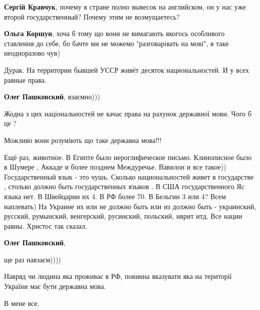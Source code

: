 \begin{itemize}
\begin{itemize}
\textbf{Сергій Кравчук}, почему в стране полно вывесок на английском, он у нас уже второй государственный? Почему этим не возмущаетесь?

\textbf{Ольга Коршун}, хоча б тому що вони не вимагають якогось особливого ставлення до себе, бо бачте ми не можемо "разговарівать на мові", я таке неодноразово чув)

Дурак. На территории бывшей УССР живёт десяток национальностей. И у всех равные
права.


\textbf{Олег Пашковский}, взаємно)))

Жодна з цих національностей не качає права на рахунок державної мови. Чого б це
?

Можливо вони розуміють що таке державна мова!!!


Ещё раз, животное. В Египте было иероглифическое письмо. Клинописное было в
Шумере , Аккаде и более позднем Междуречье. Вавилон и все такое))
Государственный язык - это чушь. Сколько национальностей живет в государстве ,
столько должно быть государственных языков . В США государственного Яс языка
нет. В Швейцарии их 4. В РФ более 70. В Бельгии 3 или 4? Всем наплевать) На
Украине их или не должно быть или из должно быть - украинский, русский,
румынский, венгерский, русинский, польский, иврит итд. Все нации равны. Христос
так сказал.


\textbf{Олег Пашковский}, 

ще раз навзаєм))))

Навряд чи людина яка проживає в РФ, повинна вказувати яка на території України
має бути державна мова.

В мене все.


\end{itemize}
\end{itemize}
